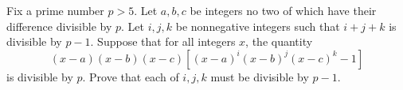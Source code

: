 Fix a prime number $p>5$. Let $a,b,c$ be integers no two of which have their difference divisible by $p$. Let $i,j,k$ be nonnegative integers such that $i+j+k$ is divisible by $p-1$. Suppose that for all integers $x$, the quantity \[\left(x-a\right)\left(x-b\right)\left(x-c\right)\left[\left(x-a\right)^i\left(x-b\right)^j\left(x-c\right)^k-1\right]\] is divisible by $p$. Prove that each of $i,j,k$ must be divisible by $p-1$.